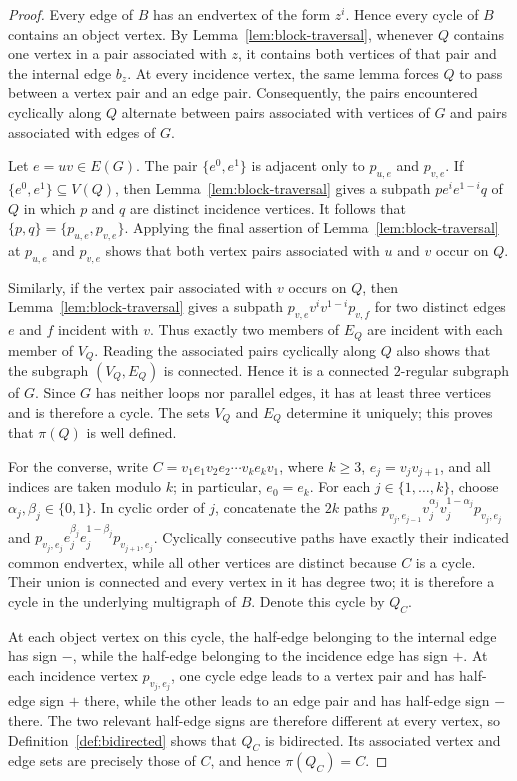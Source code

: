 \documentclass[10pt,a4paper]{amsart}
\begin{document}
\begin{proof}
Every edge of $B$ has an endvertex of the form $z^i$.  Hence every cycle of $B$
contains an object vertex.  By Lemma~\ref{lem:block-traversal}, whenever $Q$
contains one vertex in a pair associated with $z$, it contains both vertices
of that pair and the internal edge $b_z$.  At every incidence vertex, the same
lemma forces $Q$ to pass between a vertex pair and an edge pair.  Consequently,
the pairs encountered cyclically along $Q$ alternate between pairs associated
with vertices of $G$ and pairs associated with edges of $G$.

Let $e=uv\in E(G)$.  The pair $\{e^0,e^1\}$ is adjacent only to
$p_{u,e}$ and $p_{v,e}$.  If $\{e^0,e^1\}\subseteq V(Q)$, then
Lemma~\ref{lem:block-traversal} gives a subpath
$pe^ie^{1-i}q$ of $Q$ in which $p$ and $q$ are distinct incidence
vertices.  It follows that $\{p,q\}=\{p_{u,e},p_{v,e}\}$.  Applying the final
assertion of Lemma~\ref{lem:block-traversal} at $p_{u,e}$ and $p_{v,e}$ shows
that both vertex pairs associated with $u$ and $v$ occur on $Q$.

Similarly, if the vertex pair associated with $v$ occurs on $Q$, then
Lemma~\ref{lem:block-traversal} gives a subpath
$p_{v,e}v^iv^{1-i}p_{v,f}$ for two distinct edges $e$ and $f$ incident
with $v$.  Thus exactly two members of $E_Q$ are incident with each member of
$V_Q$.  Reading the associated pairs cyclically along $Q$ also shows that the
subgraph $(V_Q,E_Q)$ is connected.  Hence it is a connected $2$-regular
subgraph of $G$.  Since $G$ has neither loops nor parallel edges, it has at
least three vertices and is therefore a cycle.  The sets $V_Q$ and $E_Q$
determine it uniquely; this proves that $\pi(Q)$ is well defined.

For the converse, write $C=v_1e_1v_2e_2\cdots v_ke_kv_1$, where $k\geq3$,
$e_j=v_jv_{j+1}$, and all indices are taken modulo $k$; in particular,
$e_0=e_k$.  For each $j\in\{1,\ldots,k\}$, choose
$\alpha_j,\beta_j\in\{0,1\}$.  In cyclic order of $j$, concatenate the $2k$
paths $p_{v_j,e_{j-1}}v_j^{\alpha_j}v_j^{1-\alpha_j}p_{v_j,e_j}$ and
$p_{v_j,e_j}e_j^{\beta_j}e_j^{1-\beta_j}p_{v_{j+1},e_j}$.  Cyclically
consecutive paths have exactly their indicated common endvertex, while all
other vertices are distinct because $C$ is a cycle.  Their union is connected
and every vertex in it has degree two; it is therefore a cycle in the
underlying multigraph of $B$.  Denote this cycle by $Q_C$.

At each object vertex on this cycle, the half-edge belonging to the internal
edge has sign $-$, while the half-edge belonging to the incidence edge has
sign $+$.  At each incidence vertex $p_{v_j,e_j}$, one cycle edge leads to a
vertex pair and has half-edge sign $+$ there, while the other leads to an edge
pair and has half-edge sign $-$ there.  The two relevant half-edge signs are
therefore different at every vertex, so Definition~\ref{def:bidirected} shows
that $Q_C$ is bidirected.  Its associated vertex and edge sets are precisely
those of $C$, and hence $\pi(Q_C)=C$.


\end{proof}
\end{document}
